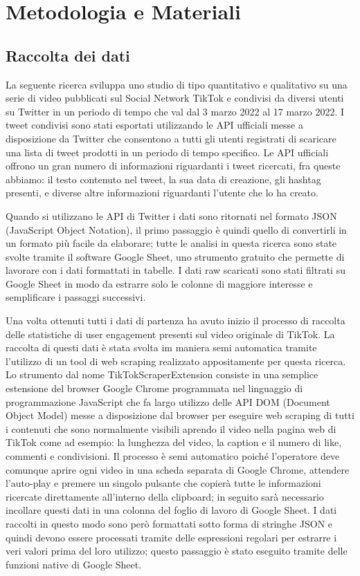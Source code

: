 \section{Metodologia e Materiali}
\label{sec:metodi}

\subsection{Raccolta dei dati}

La seguente ricerca sviluppa uno studio di tipo quantitativo e qualitativo su una serie di video pubblicati sul Social Network TikTok
e condivisi da diversi utenti su Twitter in un periodo di tempo che val dal 3 marzo 2022 al 17 marzo 2022. 
I tweet condivisi sono stati esportati utilizzando le API ufficiali messe a disposizione da Twitter\cite{twitterapi} che 
consentono a tutti gli utenti registrati di scaricare una lista di tweet prodotti in un periodo di tempo specifico. 
Le API ufficiali offrono un gran numero di informazioni riguardanti i tweet ricercati, fra queste abbiamo: il testo contenuto 
nel tweet, la sua data di creazione, gli hashtag presenti, e diverse altre informazioni riguardanti l'utente che lo ha creato.

Quando si utilizzano le API di Twitter i dati sono ritornati nel formato JSON (JavaScript Object Notation), il primo passaggio è 
quindi quello di convertirli in un formato più facile da elaborare; tutte le analisi in questa ricerca sono state svolte tramite 
il software Google Sheet\cite{googlesheet}, uno strumento gratuito che permette di lavorare con i dati formattati in tabelle. I dati raw
scaricati sono stati filtrati su Google Sheet in modo da estrarre solo le colonne di maggiore interesse e semplificare i 
passaggi successivi.

Una volta ottenuti tutti i dati di partenza ha avuto inizio il processo di raccolta delle statistiche di user engagement presenti sul 
video originale di TikTok.
La raccolta di questi dati è stata svolta im maniera semi automatica tramite l'utilizzo di un tool di web scraping realizzato 
appositamente per questa ricerca. 
Lo strumento dal nome TikTokScraperExtension\cite{scraper} consiste in una semplice estensione del browser Google Chrome 
programmata nel linguaggio di programmazione JavaScript che fa largo utilizzo delle API DOM (Document Object Model) messe a disposizione dal browser 
per eseguire web scraping di tutti i contenuti che sono normalmente visibili aprendo il video nella pagina web di TikTok come ad esempio: 
la lunghezza del video, la caption e il numero di like, commenti e condivisioni. 
Il processo è semi automatico poiché l'operatore deve comunque aprire ogni video in una scheda separata di Google Chrome, 
attendere l'auto-play e premere un singolo pulsante che copierà tutte le informazioni ricercate direttamente all'interno della clipboard; 
in seguito sarà necessario incollare questi dati in una colonna del foglio di lavoro di Google Sheet.
I dati raccolti in questo modo sono però formattati sotto forma di stringhe JSON e quindi devono essere processati tramite delle 
espressioni regolari per estrarre i veri valori prima del loro utilizzo; questo passaggio è stato eseguito tramite delle funzioni 
native di Google Sheet.

